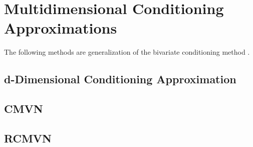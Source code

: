 \section{Multidimensional Conditioning Approximations}

The following methods are generalization of the bivariate conditioning method \citep{trinh2015bivariate}. 

\subsection{d-Dimensional Conditioning Approximation}

\subsection{CMVN}
\subsection{RCMVN}
